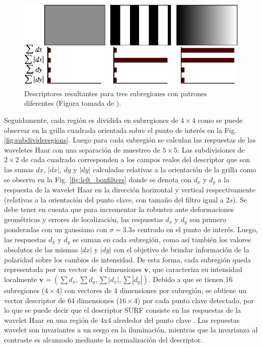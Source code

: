       \begin{figure}[tbhp]
	\centering
	      \includegraphics[scale=0.60]{./figs/descriptorresponses}
	  \caption[Descriptores resultantes para tres subregiones con patrones diferentes]{Descriptores resultantes para tres subregiones con patrones diferentes (Figura tomada de \cite{Bay:2008:SRF}).}
	\label{fig:descriptorresponses}                %
      \end{figure}
      Seguidamente, cada región es dividida en subregiones de $4 \times 4$ como se puede observar en la grilla cuadrada orientada sobre el punto de interés en la Fig. \ref{fig:subdivideregions}. Luego para cada subregión se calculan las respuestas de las waveletes Haar con una separación de muestreo de $5 \times 5$. Las subdivisiones de $2 \times 2$ de cada cuadrado corresponden a los campos reales del descriptor que son las sumas $dx$, $|dx|$, $dy$ y $|dy|$ calculadas relativas a la orientación de la grilla como se observa en la Fig. \ref{fig:left_boxfilters} donde se denota con $d_x$ y $d_y$ a la respuesta de la wavelet Haar en la dirección horizontal y vertical respectivamente (relativas a la orientación del punto clave, con tamaño del filtro igual a $2s$). Se debe tener en cuenta que para incrementar la robustez ante deformaciones geométricas y errores de localización, las respuestas $d_x$ y $d_y$ son primero ponderadas con un gaussiano con $\sigma=3.3s$ centrado en el punto de interés. %
      Luego, las respuestas $d_x$ y $d_y$ se suman en cada subregión, como así también los valores absolutos de las mismas $|dx|$ y $|dy|$ con el objetivo de brindar información de la polaridad sobre los cambios de intensidad. De esta forma, cada subregión queda representada por un vector de 4 dimensiones $\mathbf{v}$, que caracteriza su intensidad localmente $\mathbf{v}=(\sum{d_x},\sum{d_y},\sum{|d_x|},\sum{|d_y|})$. Debido a que se tienen $16$ subregiones ($4 \times 4$) con vectores de 4 dimensiones por subregión, se obtiene un vector descriptor de 64 dimensiones ($16 \times 4$) por cada punto clave detectado, por lo que se puede decir que el descriptor SURF consiste en las respuestas de la wavelet Haar en una región de 4x4 alrededor del punto clave \cite{Evans09noteson}. Las repuestas wavelet son invariantes a un sesgo en la iluminación, mientras que la invarianza al contraste es alcanzado mediante la normalización del descriptor.
      
